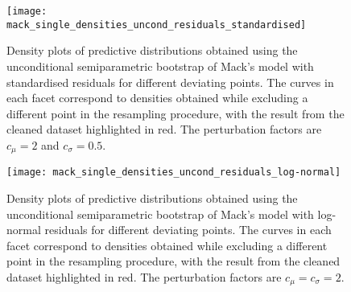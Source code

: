 \documentclass[a4paper]{book}
\begin{document}
\begin{landscape}
  \begin{figure}
    \centering
    \texttt{[image: mack\_single\_densities\_uncond\_residuals\_standardised]}
    \caption{Density plots of predictive distributions obtained using the unconditional semiparametric bootstrap of Mack's model with standardised residuals for different deviating points. The curves in each facet correspond to densities obtained while excluding a different point in the resampling procedure, with the result from the cleaned dataset highlighted in red. The perturbation factors are $c_\mu = 2$ and $c_\sigma = 0.5$.}
    \label{fig:mack-single-uncond-semiparam-standardised}
  \end{figure}
\end{landscape}

\begin{landscape}
  \begin{figure}
    \centering
    \texttt{[image: mack\_single\_densities\_uncond\_residuals\_log-normal]}
    \caption{Density plots of predictive distributions obtained using the unconditional semiparametric bootstrap of Mack's model with log-normal residuals for different deviating points. The curves in each facet correspond to densities obtained while excluding a different point in the resampling procedure, with the result from the cleaned dataset highlighted in red. The perturbation factors are $c_\mu = c_\sigma = 2$.}
    \label{fig:mack-single-uncond-semiparam-log-normal}
  \end{figure}
\end{landscape}
\end{document}
